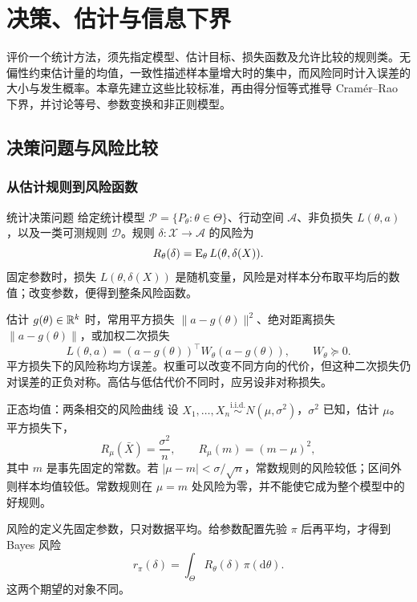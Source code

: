 \chapter{决策、估计与信息下界}

评价一个统计方法，须先指定模型、估计目标、损失函数及允许比较的规则类。无偏性约束估计量的均值，一致性描述样本量增大时的集中，而风险同时计入误差的大小与发生概率。本章先建立这些比较标准，再由得分恒等式推导 Cramér--Rao 下界，并讨论等号、参数变换和非正则模型。

\section{决策问题与风险比较}

\subsection{从估计规则到风险函数}
\begin{definitionbox}{统计决策问题}
给定统计模型 $\mathcal P=\{P_\theta:\theta\in\Theta\}$、行动空间 $\mathcal A$、非负损失 $L(\theta,a)$，以及一类可测规则 $\mathcal D$。规则 $\delta:\mathcal X\to\mathcal A$ 的风险为
\[
 R_\theta(\delta)=\operatorname{E}_\theta L(\theta,\delta(X)).
\]
固定参数时，损失 $L(\theta,\delta(X))$ 是随机变量，风险是对样本分布取平均后的数值；改变参数，便得到整条风险函数。
\end{definitionbox}

估计 $g(\theta)\in\mathbb R^k$ 时，常用平方损失 $\|a-g(\theta)\|^2$、绝对距离损失 $\|a-g(\theta)\|$，或加权二次损失
\[
 L(\theta,a)=(a-g(\theta))^\top W_\theta(a-g(\theta)),
 \qquad W_\theta\succeq0.
\]
平方损失下的风险称均方误差。权重可以改变不同方向的代价，但这种二次损失仍对误差的正负对称。高估与低估代价不同时，应另设非对称损失。

\begin{examplebox}{正态均值：两条相交的风险曲线}
设 $X_1,\ldots,X_n\overset{\mathrm{i.i.d.}}\sim N(\mu,\sigma^2)$，$\sigma^2$ 已知，估计 $\mu$。平方损失下，
\[
 R_\mu(\bar X)=\frac{\sigma^2}{n},\qquad
 R_\mu(m)=(m-\mu)^2,
\]
其中 $m$ 是事先固定的常数。若 $|\mu-m|<\sigma/\sqrt n$，常数规则的风险较低；区间外则样本均值较低。常数规则在 $\mu=m$ 处风险为零，并不能使它成为整个模型中的好规则。
\end{examplebox}

风险的定义先固定参数，只对数据平均。给参数配置先验 $\pi$ 后再平均，才得到 Bayes 风险
\[
 r_\pi(\delta)=\int_\Theta R_\theta(\delta)\,\pi(\mathrm d\theta).
\]
这两个期望的对象不同。

